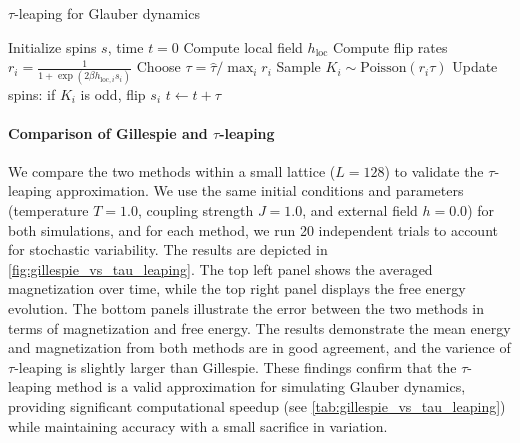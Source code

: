 \documentclass[11pt,a4paper]{article}
\begin{document}
\begin{algorithm}[h]
\caption{$\tau$-leaping for Glauber dynamics}
\label{alg:tau-leaping}
\begin{algorithmic}[1]
\State Initialize spins $s$, time $t=0$
    \State Compute local field $h_{\text{loc}}$
    \State Compute flip rates $r_i = \frac{1}{1 + \exp(2 \beta h_{\text{loc},i} s_i)}$
    \State Choose $\tau = \hat{\tau} / \max_i r_i$
    \State Sample $K_i \sim \mathrm{Poisson}(r_i \tau)$
    \State Update spins: if $K_i$ is odd, flip $s_i$
    \State $t \gets t + \tau$
\EndWhile
\end{algorithmic}
\end{algorithm}

\paragraph{Comparison of Gillespie and $\tau$-leaping} We compare the two methods within a small lattice ($L=128$) to validate the $\tau$-leaping approximation. 
We use the same initial conditions and parameters (temperature $T = 1.0$, coupling strength $J = 1.0$, and external field $h = 0.0$) for both simulations, and for each method, we run 20 independent trials to account for stochastic variability. 
The results are depicted in \cref{fig:gillespie_vs_tau_leaping}. 
The top left panel shows the averaged magnetization over time, while the top right panel displays the free energy evolution. The bottom panels illustrate the error between the two methods in terms of magnetization and free energy. 
The results demonstrate the mean energy and magnetization from both methods are in good agreement, and the varience of $\tau$-leaping is slightly larger than Gillespie. 
These findings confirm that the $\tau$-leaping method is a valid approximation for simulating Glauber dynamics, providing significant computational speedup (see \cref{tab:gillespie_vs_tau_leaping}) while maintaining accuracy with a small sacrifice in variation.
\end{document}
